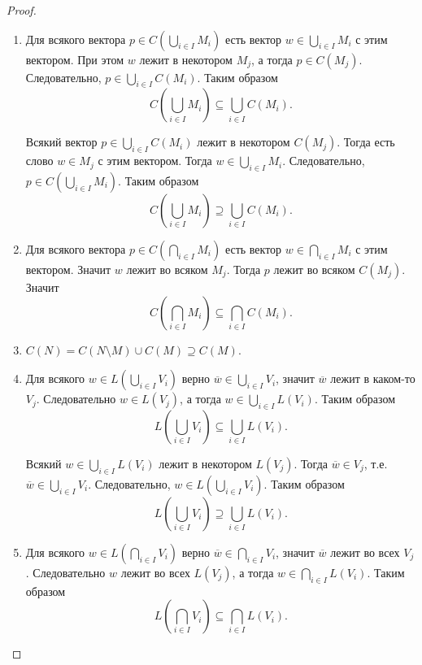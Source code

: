 \documentclass[12pt,a4paper]{article}
\begin{document}
\begin{problem}{8}
\begin{enumerate}
                \begin{proof}\ 
                    \begin{enumerate}
                        \item Для всякого вектора $p \in C\left(\bigcup_{i \in I} M_i\right)$ есть вектор $w \in \bigcup_{i \in I} M_i$ с этим вектором. При этом $w$ лежит в некотором $M_j$, а тогда $p \in C(M_j)$. Следовательно, $p \in \bigcup_{i \in I} C(M_i)$. Таким образом
                            \[C\left(\bigcup_{i \in I} M_i\right) \subseteq \bigcup_{i \in I} C(M_i).\]

                            Всякий вектор $p \in \bigcup_{i \in I} C(M_i)$ лежит в некотором $C(M_j)$. Тогда есть слово $w \in M_j$ с этим вектором. Тогда $w \in \bigcup_{i \in I} M_i$. Следовательно, $p \in C\left(\bigcup_{i \in I} M_i\right)$. Таким образом
                            \[C\left(\bigcup_{i \in I} M_i\right) \supseteq \bigcup_{i \in I} C(M_i).\]
                        
                        \item Для всякого вектора $p \in C\left(\bigcap_{i \in I} M_i\right)$ есть вектор $w \in \bigcap_{i \in I} M_i$ с этим вектором. Значит $w$ лежит во всяком $M_j$. Тогда $p$ лежит во всяком $C(M_j)$. Значит
                            \[C\left(\bigcap_{i \in I} M_i\right) \subseteq \bigcap_{i \in I} C(M_i).\]

                        \item $C(N) = C(N \setminus M) \cup C(M) \supseteq C(M)$.

                        \item Для всякого $w \in L\left(\bigcup_{i \in I} V_i\right)$ верно $\overline{w} \in \bigcup_{i \in I} V_i$, значит $\overline{w}$ лежит в каком-то $V_j$. Следовательно $w \in L(V_j)$, а тогда $w \in \bigcup_{i \in I} L(V_i)$. Таким образом
                            \[L\left(\bigcup_{i \in I} V_i\right) \subseteq \bigcup_{i \in I} L(V_i).\]

                            Всякий $w \in \bigcup_{i \in I} L(V_i)$ лежит в некотором $L(V_j)$. Тогда $\overline{w} \in V_j$, т.е. $\overline{w} \in \bigcup_{i \in I} V_i$. Следовательно, $w \in L\left(\bigcup_{i \in I} V_i\right)$. Таким образом
                            \[L\left(\bigcup_{i \in I} V_i\right) \supseteq \bigcup_{i \in I} L(V_i).\]
                            
                        \item Для всякого $w \in L\left(\bigcap_{i \in I} V_i\right)$ верно $\overline{w} \in \bigcap_{i \in I} V_i$, значит $\overline{w}$ лежит во всех $V_j$. Следовательно $w$ лежит во всех $L(V_j)$, а тогда $w \in \bigcap_{i \in I} L(V_i)$. Таким образом
                            \[L\left(\bigcap_{i \in I} V_i\right) \subseteq \bigcap_{i \in I} L(V_i).\]


\end{enumerate}
\end{proof}
\end{enumerate}
\end{problem}
\end{document}
